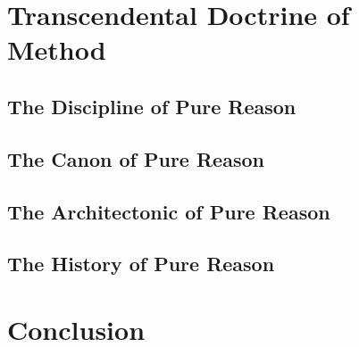\documentclass[a4paper]{article}
\begin{document}
\section{Transcendental Doctrine of Method}

\subsection{The Discipline of Pure Reason}

\subsection{The Canon of Pure Reason}

\subsection{The Architectonic of Pure Reason}

\subsection{The History of Pure Reason}

\section{Conclusion}



\printbibliography
\end{document}
